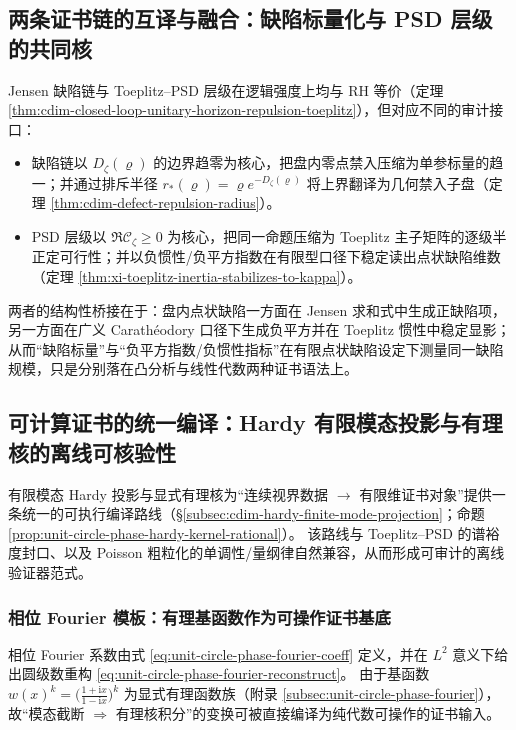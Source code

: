 \subsection{两条证书链的互译与融合：缺陷标量化与 PSD 层级的共同核}\label{subsec:cdim-defect-toeplitz-translation-fusion}
Jensen 缺陷链与 Toeplitz--PSD 层级在逻辑强度上均与 RH 等价（定理 \ref{thm:cdim-closed-loop-unitary-horizon-repulsion-toeplitz}），但对应不同的审计接口：
\begin{itemize}
  \item 缺陷链以 \(D_{\zeta}(\varrho)\) 的边界趋零为核心，把盘内零点禁入压缩为单参标量的趋一；并通过排斥半径 \(r_{\ast}(\varrho)=\varrho e^{-D_{\zeta}(\varrho)}\) 将上界翻译为几何禁入子盘（定理 \ref{thm:cdim-defect-repulsion-radius}）。
  \item PSD 层级以 \(\Re\mathscr{C}_{\zeta}\ge 0\) 为核心，把同一命题压缩为 Toeplitz 主子矩阵的逐级半正定可行性；并以负惯性/负平方指数在有限型口径下稳定读出点状缺陷维数（定理 \ref{thm:xi-toeplitz-inertia-stabilizes-to-kappa}）。
\end{itemize}
两者的结构性桥接在于：盘内点状缺陷一方面在 Jensen 求和式中生成正缺陷项，另一方面在广义 Carath\'eodory 口径下生成负平方并在 Toeplitz 惯性中稳定显影；从而“缺陷标量”与“负平方指数/负惯性指标”在有限点状缺陷设定下测量同一缺陷规模，只是分别落在凸分析与线性代数两种证书语法上。

\subsection{可计算证书的统一编译：Hardy 有限模态投影与有理核的离线可核验性}\label{subsec:cdim-computable-certificate-unified-compilation}
有限模态 Hardy 投影与显式有理核为“连续视界数据 \(\to\) 有限维证书对象”提供一条统一的可执行编译路线（\S\ref{subsec:cdim-hardy-finite-mode-projection}；命题 \ref{prop:unit-circle-phase-hardy-kernel-rational}）。
该路线与 Toeplitz--PSD 的谱裕度封口、以及 Poisson 粗粒化的单调性/量纲律自然兼容，从而形成可审计的离线验证器范式。

\subsubsection{相位 Fourier 模板：有理基函数作为可操作证书基底}
相位 Fourier 系数由式 \eqref{eq:unit-circle-phase-fourier-coeff} 定义，并在 \(L^2\) 意义下给出圆级数重构 \eqref{eq:unit-circle-phase-fourier-reconstruct}。
由于基函数 \(w(x)^k=\bigl(\frac{1+\mathrm{i}x}{1-\mathrm{i}x}\bigr)^k\) 为显式有理函数族（附录 \ref{subsec:unit-circle-phase-fourier}），故“模态截断 \(\Rightarrow\) 有理核积分”的变换可被直接编译为纯代数可操作的证书输入。

